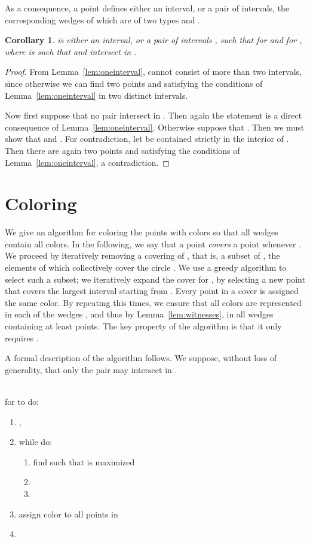 \documentclass[english,11pt]{article}
\newtheorem{corollary}{Corollary}
\begin{document}
As a consequence, a point defines either an interval, or a pair of intervals, the corresponding wedges of which are of two types  and .

\begin{corollary}
\label{cor:interval}
 is either an interval, or a pair of intervals , such that  for  and  for , where  is such that  and  intersect in .
\end{corollary}
\begin{proof}
From Lemma~\ref{lem:oneinterval},  cannot consist of more than two intervals, since otherwise we can find two points  and  satisfying the conditions of Lemma~\ref{lem:oneinterval} in two distinct intervals.

Now first suppose  that no pair  intersect in . Then again the statement is a direct consequence of Lemma~\ref{lem:oneinterval}. Otherwise suppose that . Then we must show that  and . For contradiction, let  be contained strictly in the interior of . Then there are again two points  and  satisfying the conditions of Lemma~\ref{lem:oneinterval}, a contradiction.
\end{proof}

\section{Coloring}
\label{sec:coloring}

We give an algorithm for coloring the points with  colors so that all wedges  contain all  colors. In the following, we say that a point  {\em covers} a point  whenever . We proceed by iteratively removing a covering of , that is, a subset of , the elements of which collectively cover the circle . We use a greedy algorithm to select such a subset; we iteratively expand the cover for , by selecting a new point that covers the largest interval starting from . Every point in a cover is assigned the same color. By repeating this  times, we ensure that all  colors are represented in each of the wedges , and thus by Lemma~\ref{lem:witnesses}, in all wedges containing at least  points. The key property of the algorithm is that it only requires .

A formal description of the algorithm follows. We suppose, without loss of generality, that only the pair  may intersect in .\medskip

\noindent \begin{minipage}{\textwidth}
\\

\noindent for  to  do:
\begin{enumerate}
  \item , 
  \item while  do:
  \begin{enumerate}
     \item find  such that  is maximized
     \item 
     \item 
  \end{enumerate}
  \item assign color  to all points in 
  \item 
\end{enumerate}
~
\end{minipage}
\end{document}
